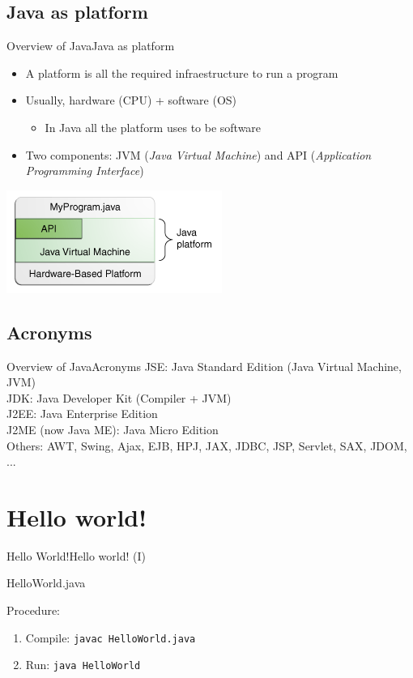 \documentclass[10pt,compress]{beamer} %
\begin{document}
\subsection[Java as platform]{Java as platform}
\begin{frame}{Overview of Java}{Java as platform}
	\begin{itemize}
	\item A platform is all the required infraestructure to run a program
	\item Usually, hardware (CPU) + software (OS)
		\begin{itemize}
		\item In Java all the platform uses to be software
		\end{itemize}
	\item Two components: JVM (\textit{Java Virtual Machine}) and API (\textit{Application Programming Interface})
	\end{itemize}
	\centering\includegraphics[width=0.5\linewidth]{figs/getStarted-jvm}\\
\end{frame}

\subsection[Acronyms]{Acronyms}
\begin{frame}{Overview of Java}{Acronyms}
	JSE: Java Standard Edition (Java Virtual Machine, JVM)\\
	JDK: Java Developer Kit (Compiler + JVM)\\
	J2EE: Java Enterprise Edition\\
	J2ME (now Java ME): Java Micro Edition\\
	Others: AWT, Swing, Ajax, EJB, HPJ, JAX, JDBC, JSP, Servlet, SAX, JDOM, ...
\end{frame}

\section[Hello world!]{Hello world!}
\begin{frame}{Hello World!}{Hello world! (I)}
	\vspace{-0.2cm}
	\begin{block}{HelloWorld.java}
		
	\end{block}

	Procedure:
	\begin{enumerate}
		\item Compile: \texttt{javac HelloWorld.java}
		\item Run: \texttt{java HelloWorld}
	\end{enumerate}
\end{frame}
\end{document}
